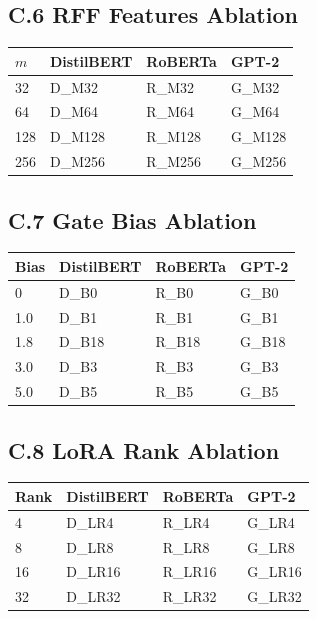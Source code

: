 \subsection{C.6 RFF Features Ablation}

\begin{table}[H]
\centering
\small
\begin{tabular}{llll}
\toprule
\textbf{$m$} & \textbf{DistilBERT} & \textbf{RoBERTa} & \textbf{GPT-2} \\
\midrule
32 & {{D\_M32}} & {{R\_M32}} & {{G\_M32}} \\
64 & {{D\_M64}} & {{R\_M64}} & {{G\_M64}} \\
128 & {{D\_M128}} & {{R\_M128}} & {{G\_M128}} \\
256 & {{D\_M256}} & {{R\_M256}} & {{G\_M256}} \\
\bottomrule
\end{tabular}
\end{table}

\subsection{C.7 Gate Bias Ablation}

\begin{table}[H]
\centering
\small
\begin{tabular}{llll}
\toprule
\textbf{Bias} & \textbf{DistilBERT} & \textbf{RoBERTa} & \textbf{GPT-2} \\
\midrule
0 & {{D\_B0}} & {{R\_B0}} & {{G\_B0}} \\
1.0 & {{D\_B1}} & {{R\_B1}} & {{G\_B1}} \\
1.8 & {{D\_B18}} & {{R\_B18}} & {{G\_B18}} \\
3.0 & {{D\_B3}} & {{R\_B3}} & {{G\_B3}} \\
5.0 & {{D\_B5}} & {{R\_B5}} & {{G\_B5}} \\
\bottomrule
\end{tabular}
\end{table}

\subsection{C.8 LoRA Rank Ablation}

\begin{table}[H]
\centering
\small
\begin{tabular}{llll}
\toprule
\textbf{Rank} & \textbf{DistilBERT} & \textbf{RoBERTa} & \textbf{GPT-2} \\
\midrule
4 & {{D\_LR4}} & {{R\_LR4}} & {{G\_LR4}} \\
8 & {{D\_LR8}} & {{R\_LR8}} & {{G\_LR8}} \\
16 & {{D\_LR16}} & {{R\_LR16}} & {{G\_LR16}} \\
32 & {{D\_LR32}} & {{R\_LR32}} & {{G\_LR32}} \\
\bottomrule
\end{tabular}
\end{table}

